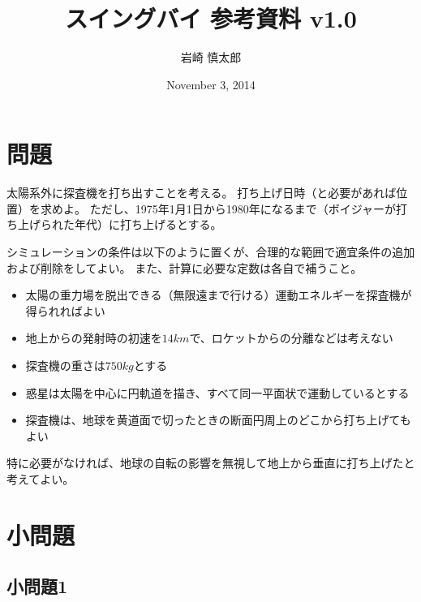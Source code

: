 \documentclass{article}
\title{ スイングバイ 参考資料 v1.0 }
\author{ 岩崎 慎太郎 }
\begin{document}
\date{November 3, 2014}
\maketitle

\section{ 問題 }

太陽系外に探査機を打ち出すことを考える。
打ち上げ日時（と必要があれば位置）を求めよ。
ただし、1975年1月1日から1980年になるまで（ボイジャーが打ち上げられた年代）に打ち上げるとする。

シミュレーションの条件は以下のように置くが、合理的な範囲で適宜条件の追加および削除をしてよい。
また、計算に必要な定数は各自で補うこと。

\begin{itemize}
\item 太陽の重力場を脱出できる（無限遠まで行ける）運動エネルギーを探査機が得られればよい
\item 地上からの発射時の初速を$14km$で、ロケットからの分離などは考えない
\item 探査機の重さは$750kg$とする
\item 惑星は太陽を中心に円軌道を描き、すべて同一平面状で運動しているとする
\item 探査機は、地球を黄道面で切ったときの断面円周上のどこから打ち上げてもよい
\end{itemize}

特に必要がなければ、地球の自転の影響を無視して地上から垂直に打ち上げたと考えてよい。

\section{ 小問題 }

\subsection{ 小問題1 }
\end{document}
